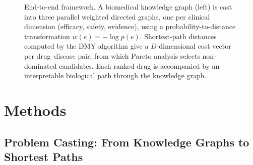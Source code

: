 \documentclass[11pt,a4paper]{article}
\begin{document}
\begin{figure}[t]
\caption{End-to-end framework. A biomedical knowledge graph (left) is
cast into three parallel weighted directed graphs, one per clinical
dimension (efficacy, safety, evidence), using a probability-to-distance
transformation $w(e) = -\log p(e)$. Shortest-path distances computed by
the DMY algorithm \citep{duan2025sssp} give a $D$-dimensional cost
vector per drug--disease pair, from which Pareto analysis selects
non-dominated candidates. Each ranked drug is accompanied by an
interpretable biological path through the knowledge graph.}
\label{fig:overview}
\end{figure}

\section{Methods}
\label{sec:methods}

\subsection{Problem Casting: From Knowledge Graphs to Shortest Paths}
\label{sec:methods:casting}
\end{document}
